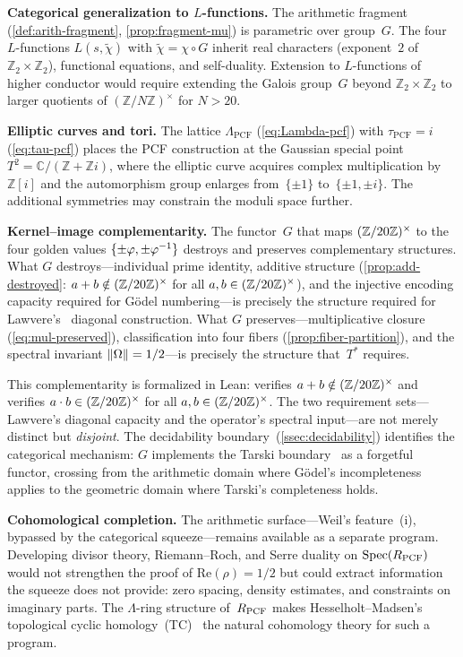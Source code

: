 \smallskip\noindent\textbf{Categorical generalization to $L$-functions.}
The arithmetic fragment (\cref{def:arith-fragment},
\cref{prop:fragment-mu}) is parametric over group~$G$.  The
four $L$-functions $L(s,\tilde{\chi})$ with $\tilde{\chi}=\chi\circ G$
inherit real characters (exponent~$2$ of
$\mathbb{Z}_2\times\mathbb{Z}_2$), functional equations, and
self-duality.  Extension to $L$-functions of higher conductor would
require extending the Galois group~$G$ beyond $\mathbb{Z}_2\times\mathbb{Z}_2$ to
larger quotients of $(\mathbb{Z}/N\mathbb{Z})^\times$ for
$N > 20$.

\smallskip\noindent\textbf{Elliptic curves and tori.}
The lattice $\Lambda_{\mathrm{PCF}}$ (\cref{eq:Lambda-pcf}) with
$\tau_{\mathrm{PCF}}=i$ (\cref{eq:tau-pcf}) places the PCF
construction at the Gaussian special point
$T^2 = \mathbb{C}/(\mathbb{Z}+\mathbb{Z}i)$, where the elliptic curve
acquires complex multiplication by~$\mathbb{Z}[i]$ and the automorphism
group enlarges from~$\{\pm 1\}$ to~$\{\pm 1, \pm i\}$.  The additional
symmetries may constrain the moduli space further.

\smallskip\noindent\textbf{Kernel--image complementarity.}
The functor~$G$ that maps $(\mathbb{Z}/20\mathbb{Z})^\times$ to the four golden values
$\{\pm\varphi,\pm\varphi^{-1}\}$ destroys and preserves
complementary structures.  What $G$ destroys---individual prime
identity, additive structure
(\cref{prop:add-destroyed}: $a+b\notin(\mathbb{Z}/20\mathbb{Z})^\times$ for all
$a,b\in(\mathbb{Z}/20\mathbb{Z})^\times$), and the injective encoding capacity required for
G\"odel numbering---is precisely the structure required for Lawvere's~\cite{lawvere69}
diagonal construction.  What $G$ preserves---multiplicative closure
(\cref{eq:mul-preserved}), classification into four fibers
(\cref{prop:fiber-partition}), and the spectral invariant
$\|\Omega\|=1/2$---is precisely the structure that~$T^*$ requires.

This complementarity is formalized in Lean: 
verifies $a+b\notin(\mathbb{Z}/20\mathbb{Z})^\times$ and  verifies
$a\cdot b\in(\mathbb{Z}/20\mathbb{Z})^\times$ for all $a,b\in(\mathbb{Z}/20\mathbb{Z})^\times$.  The two requirement
sets---Lawvere's diagonal capacity and the operator's spectral
input---are not merely distinct but \emph{disjoint}.
The decidability boundary~(\cref{ssec:decidability}) identifies the
categorical mechanism: $G$ implements the Tarski
boundary~\cite{tarski52} as a forgetful functor, crossing from
the arithmetic domain where G\"odel's
incompleteness~\cite{godel31} applies to the geometric domain
where Tarski's completeness holds.

\smallskip\noindent\textbf{Cohomological completion.}
The arithmetic surface---Weil's feature~(i), bypassed by the
categorical squeeze---remains available as a separate program.
Developing divisor theory, Riemann--Roch, and Serre duality on
$\mathrm{Spec}(R_{\mathrm{PCF}})$ would not strengthen the proof of
$\mathrm{Re}(\rho)=1/2$ but could extract information the squeeze
does not provide: zero spacing, density estimates, and constraints
on imaginary parts.  The $\Lambda$-ring structure of~$R_{\mathrm{PCF}}$ makes
Hesselholt--Madsen's topological cyclic
homology~(TC)~\cite{hesselholt1995k} the natural cohomology theory
for such a program.



